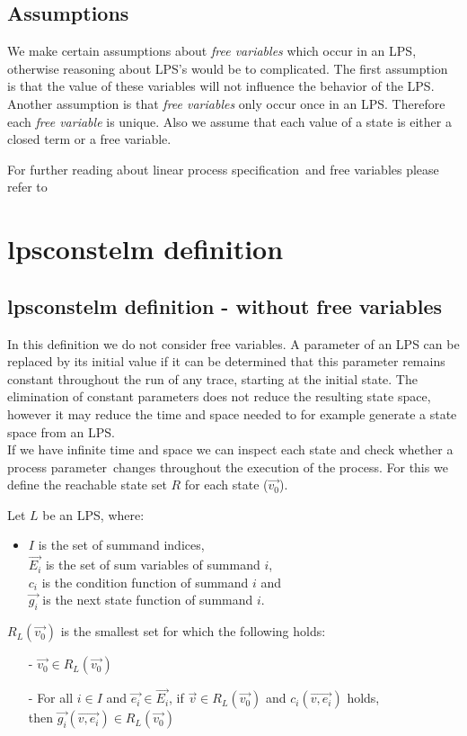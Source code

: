 \index{}\documentclass[a4paper,10pt]{article}
\theoremstyle{plain}
\theoremstyle{definition}
\newcommand{\lps}{linear process specification}
\newcommand{\ovr}{\overrightarrow}
\newcommand{\pp}{process parameter}
\newcommand{\ti}{\textit}
\begin{document}
\subsection{Assumptions}
We make certain assumptions about \ti{free variables} which occur in an LPS, otherwise reasoning about LPS's would be to complicated. The first assumption is that the value of these variables will not influence the behavior of the LPS. Another assumption is that \ti{free variables} only occur once in an LPS. Therefore each \ti{free variable} is unique.
Also we assume that each value of a state is either a closed term or a free variable.

For further reading about \lps\ and free variables please refer to \cite{LPSfreevar}

\section{lpsconstelm definition}\label{subsec:lpsdef}
\subsection{lpsconstelm definition - without free variables}

In this definition we do not consider free variables.
A parameter of an LPS can be replaced by its initial value if it can be determined that this parameter remains constant throughout the run of any trace, starting at the initial state. The elimination of constant parameters does not reduce the resulting state space, however it may reduce the time and space needed to for example generate a state space from an LPS. \\
If we have infinite time and space we can inspect each state and check whether a \pp\ changes throughout the execution of the process. For this we define the reachable state set $R$ for each state ($\ovr{v_0}$).

\begin{defn} Let $L$ be an LPS, where: \\
\begin{itemize}
\item $I$ is the set of summand indices, \\ $\ovr{E_i}$ is the set of sum variables of summand $i$, \\ $c_i$ is the condition function of summand $i$ and \\ $\ovr{g_i}$ is the next state function of summand $i$.
\end{itemize}

$R_L(\ovr{v_0})$ is the smallest set for which the following holds:
  \begin{itemize}
    \item[-] $\ovr{v_0} \in R_L(\ovr{v_0})$
    \item[-] For all $i \in I$ and $\ovr{e_i} \in \ovr{E_i}$, if $\ovr{v} \in R_L(\ovr{v_0})$ and $c_i(\ovr{v, e_i})$ holds, \\ then $\ovr{g_i}(\ovr{v, e_i}) \in R_L(\ovr{v_0})$ \\
   \end{itemize}
\end{defn}
\end{document}
